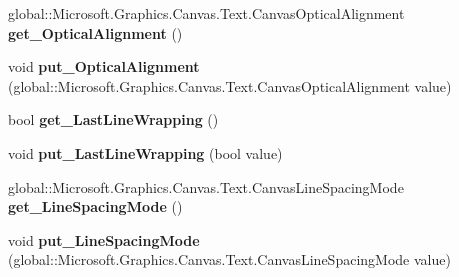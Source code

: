 \begin{DoxyCompactItemize}
\item 
\mbox{\label{interface_microsoft_1_1_graphics_1_1_canvas_1_1_text_1_1_i_canvas_text_format_a6266ab0128ef88ed3a47c3b55f8d882a}} 
global\+::\+Microsoft.\+Graphics.\+Canvas.\+Text.\+Canvas\+Optical\+Alignment {\bfseries get\+\_\+\+Optical\+Alignment} ()
\item 
\mbox{\label{interface_microsoft_1_1_graphics_1_1_canvas_1_1_text_1_1_i_canvas_text_format_af5a78a267574fdae1a3a594f0d0e7d06}} 
void {\bfseries put\+\_\+\+Optical\+Alignment} (global\+::\+Microsoft.\+Graphics.\+Canvas.\+Text.\+Canvas\+Optical\+Alignment value)
\item 
\mbox{\label{interface_microsoft_1_1_graphics_1_1_canvas_1_1_text_1_1_i_canvas_text_format_adc2620964bc8e505aa61c08c6ac78893}} 
bool {\bfseries get\+\_\+\+Last\+Line\+Wrapping} ()
\item 
\mbox{\label{interface_microsoft_1_1_graphics_1_1_canvas_1_1_text_1_1_i_canvas_text_format_a3edf3bb3860fd65883e2b0a45e28b8b4}} 
void {\bfseries put\+\_\+\+Last\+Line\+Wrapping} (bool value)
\item 
\mbox{\label{interface_microsoft_1_1_graphics_1_1_canvas_1_1_text_1_1_i_canvas_text_format_ab83d69682b1282cc0203333291e4df42}} 
global\+::\+Microsoft.\+Graphics.\+Canvas.\+Text.\+Canvas\+Line\+Spacing\+Mode {\bfseries get\+\_\+\+Line\+Spacing\+Mode} ()
\item 
\mbox{\label{interface_microsoft_1_1_graphics_1_1_canvas_1_1_text_1_1_i_canvas_text_format_a1a3230a7d36b210e60927960396f0c69}} 
void {\bfseries put\+\_\+\+Line\+Spacing\+Mode} (global\+::\+Microsoft.\+Graphics.\+Canvas.\+Text.\+Canvas\+Line\+Spacing\+Mode value)
\item 
\mbox{\label{interface_microsoft_1_1_graphics_1_1_canvas_1_1_text_1_1_i_canvas_text_format_a470488d4549d1bc276b39772375c8064}} 

\end{DoxyCompactItemize}
